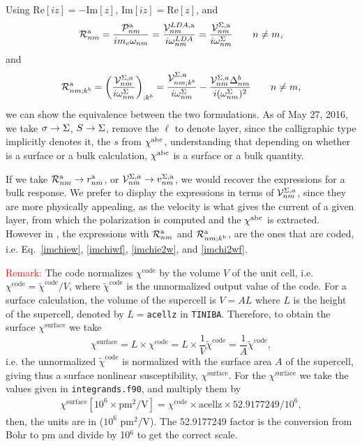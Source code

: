 Using 
$\mathrm{Re}[iz]=-\mathrm{Im}[z]$,
$\mathrm{Im}[iz]=\mathrm{Re}[z]$,
and
\begin{equation}\label{rnmenm91}
{\cal R}^{\mathrm{a}}_{nm}=\frac{{\cal P}^{\mathrm{a}}_{nm}}{im_e\omega_{nm}}
=\frac{{\cal V}^{LDA,\mathrm{a}}_{nm}}{i\omega^{LDA}_{nm}}
=\frac{{\cal V}^{\Sigma,\mathrm{a}}_{nm}}{i\omega^\Sigma_{nm}}
\quad\quad n\ne m  
,
\end{equation} 
and
\begin{equation}\label{rnmenm92n}
{\cal R}^{\mathrm{a}}_{nm;k^b}=\left(\frac{{\cal V}^{\Sigma,a}_{nm}}{i\omega^\Sigma_{nm}}\right)_{;k^b}
=\frac{{\cal V}^{\Sigma,a}_{nm;k^b}}{i\omega^\Sigma_{nm}}
-
\frac{{\cal V}^{\Sigma,a}_{nm}\Delta^b_{nm}}{i(\omega^\Sigma_{nm})^2}
\quad\quad n\ne m 
,
\end{equation}
we can show the equivalence between the two formulations.
As of May 27, 2016, we take $\sigma\to\Sigma$, $S\to\Sigma$, remove the $\ell$
to denote layer, since the calligraphic type implicitly denotes it,
the $s$ from $\chi^{\mathrm{a}\mathrm{b}\mathrm{c}}$, understanding that depending on whether is a
surface or a bulk calculation, $\chi^{\mathrm{a}\mathrm{b}\mathrm{c}}$ is a surface or a
bulk quantity.  

\noindent If we take ${\cal R}^{\mathrm{a}}_{nm}\to r^{\mathrm{a}}_{nm}$, 
or
${\cal V}^{\Sigma,a}_{nm}\to v^{\Sigma,\mathrm{a}}_{nm}$, 
we
would recover the expressions for a bulk response.
We prefer to display the expressions in terms of ${\cal V}^{\Sigma,a}_{nm}$, since they are
more physically appealing, as the velocity is what gives the current
of a given layer, from which the polarization is computed and the
$\chi^{\mathrm{a}\mathrm{b}\mathrm{c}}$ is extracted. However in \tiniba, the
expressions with ${\cal R}^{\mathrm{a}}_{nm}$ and     
${\cal R}^{\mathrm{a}}_{nm;k^{\mathrm{b}}}$, are the ones that are coded, i.e.
Eq.~\eqref{imchiew}, \eqref{imchiwf}, \eqref{imchie2w}, 
and \eqref{imchi2wf}.

\textcolor{red}{Remark:}  
The code normalizes $\chi^{\text{code}}$ by the volume $V$ of the unit cell, i.e.
$\chi^{\text{code}}=\tilde\chi^{\text{code}}/V$, where
$\tilde\chi^{\text{code}}$ is the unnormalized output value of the code.
 For a
surface calculation, the volume of the supercell is $V=AL$ where $L$
is the height of the supercell, denoted by $L=$\verb=acellz= in
\verb=TINIBA=. Therefore, to obtain the surface
$\chi^{\text{surface}}$ we take
\begin{equation}\label{chisurf}
\chi^{\text{surface}}=L\times\chi^{\text{code}}
=L\times\frac{1}{V}\tilde\chi^{\text{code}}
=\frac{1}{A}\tilde\chi^{\text{code}}
,
\end{equation}
i.e. the unnormalized $\tilde\chi^{\text{code}}$ is normalized with
the surface area $A$ of the supercell, giving thus a surface nonlinear
susceptibility, $\chi^{\text{surface}}$.  
For the $\chi^{\text{surface}}$ we take the values given in
\verb=integrands.f90=, and multiply them by
\begin{align}\label{units.1}
\chi^{\text{surface}}[10^6\times\text{pm}^2/\text{V}]=
\chi^{\text{code}}\times \text{acellz}\times52.9177249/10^6
,
\end{align}
then, the 
units are in ($10^6$ pm$^2$/V). 
The 52.9177249 factor is the conversion from Bohr to pm and
divide by 10$^6$ to get the correct scale.

